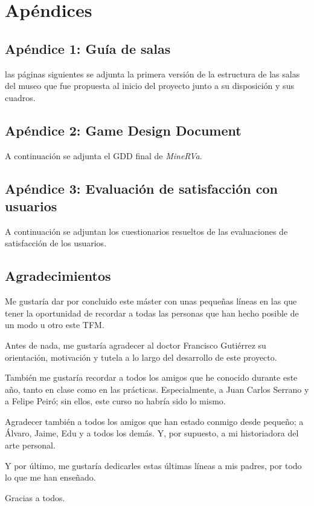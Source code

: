 \chapter{Apéndices}
\label{chap:apendices}

\section{Apéndice 1: Guía de salas}
\label{anexo:guia-salas}

 las páginas siguientes se adjunta la primera versión de la estructura de las salas del museo que fue propuesta al inicio del proyecto junto a su disposición y sus cuadros.




\section{Apéndice 2: Game Design Document}
\label{anexo:gdd}

A continuación se adjunta el \acs{GDD} final de \textit{MineRVa}.

\newpage




\section{Apéndice 3: Evaluación de satisfacción con usuarios}
\label{anexo:evaluacion-satisfaccion}

A continuación se adjuntan los cuestionarios resueltos de las evaluaciones de satisfacción de los usuarios.

\newpage



\newpage

\section{Agradecimientos}


Me gustaría dar por concluido este máster con unas pequeñas líneas en las que tener la oportunidad de recordar a todas las personas que han hecho posible de un modo u otro este \acs{TFM}.

Antes de nada, me gustaría agradecer al doctor Francisco Gutiérrez su orientación, motivación y tutela a lo largo del desarrollo de este proyecto.

También me gustaría recordar a todos los amigos que he conocido durante este año, tanto en clase como en las prácticas. Especialmente, a Juan Carlos Serrano y a Felipe Peiró; sin ellos, este curso no habría sido lo mismo.

Agradecer también a todos los amigos que han estado conmigo desde pequeño; a Álvaro, Jaime, Edu y a todos los demás. Y, por supuesto, a mi historiadora del arte personal.

Y por último, me gustaría dedicarles estas últimas líneas a mis padres, por todo lo que me han enseñado.

Gracias a todos.